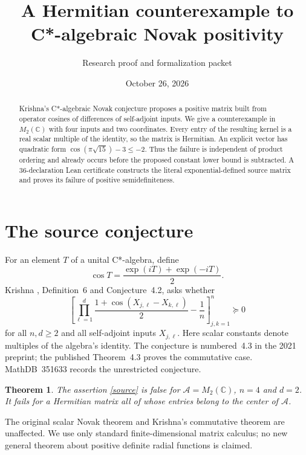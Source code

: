 \documentclass[11pt]{article}
\title{A Hermitian counterexample to\\C*-algebraic Novak positivity}
\author{Research proof and formalization packet}
\date{October 26, 2026}
\newtheorem{theorem}{Theorem}
\begin{document}
\maketitle
\begin{abstract}
Krishna's C*-algebraic Novak conjecture proposes a positive matrix built
from operator cosines of differences of self-adjoint inputs. We give a
counterexample in $M_2(\mathbb C)$ with four inputs and two coordinates.
Every entry of the resulting kernel is a real scalar multiple of the
identity, so the matrix is Hermitian. An explicit vector has quadratic
form $\cos(\pi\sqrt{15})-3\leq-2$. Thus the failure is independent of
product ordering and already occurs before the proposed constant lower
bound is subtracted. A 36-declaration Lean certificate constructs the
literal exponential-defined source matrix and proves its failure of
positive semidefiniteness.
\end{abstract}

\section{The source conjecture}
For an element $T$ of a unital C*-algebra, define
\[
 \cos T=\frac{\exp(iT)+\exp(-iT)}2.
\]
Krishna \cite{K}, Definition~6 and Conjecture~4.2, asks whether
\begin{equation}\label{source}
 \left[\prod_{\ell=1}^{d}
 \frac{1+\cos(X_{j,\ell}-X_{k,\ell})}{2}-\frac1n\right]_{j,k=1}^{n}
 \succeq0
\end{equation}
for all $n,d\geq2$ and all self-adjoint inputs $X_{j,\ell}$.
Here scalar constants denote multiples of the algebra's identity.
The conjecture is numbered~4.3 in the 2021 preprint; the published
Theorem~4.3 proves the commutative case. MathDB~351633 records the
unrestricted conjecture.

\begin{theorem}\label{main}
The assertion \eqref{source} is false for $\mathcal A=M_2(\mathbb C)$,
$n=4$ and $d=2$. It fails for a Hermitian matrix all of whose entries
belong to the center of $\mathcal A$.
\end{theorem}
The original scalar Novak theorem \cite{V} and Krishna's commutative theorem are
unaffected. We use only standard finite-dimensional matrix calculus;
no new general theorem about positive definite radial functions is claimed.
\end{document}
